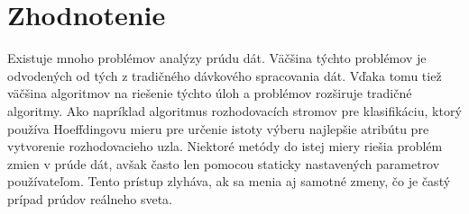 \section{Zhodnotenie}
Existuje mnoho problémov analýzy prúdu dát. Väčšina týchto problémov je odvodených od tých z tradičného dávkového spracovania dát. Vďaka tomu tiež väčšina algoritmov na riešenie týchto úloh a problémov rozširuje tradičné algoritmy. Ako napríklad algoritmus rozhodovacích stromov pre klasifikáciu, ktorý používa Hoeffdingovu mieru pre určenie istoty výberu najlepšie atribútu pre vytvorenie rozhodovacieho uzla. Niektoré metódy do istej miery riešia problém zmien v prúde dát, avšak často len pomocou staticky nastavených parametrov používateľom. Tento prístup zlyháva, ak sa menia aj samotné zmeny, čo je častý prípad prúdov reálneho sveta.



